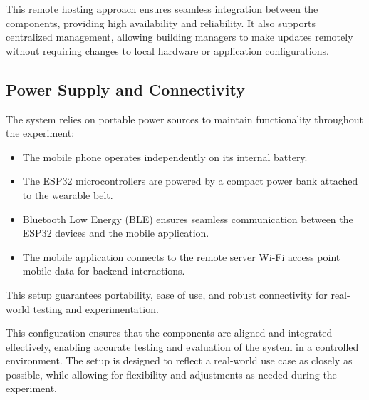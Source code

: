 This remote hosting approach ensures seamless integration between the components, providing high availability and reliability. It also supports centralized management, allowing building managers to make updates remotely without requiring changes to local hardware or application configurations.


\subsection{Power Supply and Connectivity}

The system relies on portable power sources to maintain functionality throughout the experiment:
\begin{itemize}
	\item The mobile phone operates independently on its internal battery.
	\item The ESP32 microcontrollers are powered by a compact power bank attached to the wearable belt.
	\item Bluetooth Low Energy (BLE) ensures seamless communication between the ESP32 devices and the mobile application.
	\item The mobile application connects to the remote server Wi-Fi access point mobile data for backend interactions.
\end{itemize}

This setup guarantees portability, ease of use, and robust connectivity for real-world testing and experimentation.


This configuration ensures that the components are aligned and integrated effectively, enabling accurate testing and evaluation of the system in a controlled environment. The setup is designed to reflect a real-world use case as closely as possible, while allowing for flexibility and adjustments as needed during the experiment.
